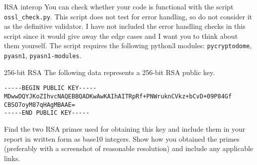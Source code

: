 \documentclass{homework}
\begin{document}
\begin{task}{RSA interop}
  You can check whether your code is functional with the script \texttt{ossl\_check.py}.
  This script does not test for error handling, so do not consider it as the definitive validator.
  I have not included the error handling checks in this script since it would give away the edge cases and I want you to think about them yourself.
  The script requires the following python3 modules: \texttt{pycryptodome}, \texttt{pyasn1}, \texttt{pyasn1-modules}.

  \iffalse
  \begin{tcolorbox}[title=Reading comprehension]
    Beware!
    If you submit a homework which:
    \begin{itemize}
      \item does not pass the test script \textbf{and}
      \item do not mention this in your report \textbf{and}
      \item do not describe in your report what you tried and what problems you still have,
    \end{itemize}
    I will consider your homework as unsubmitted for grading.
    If the deadline hits with your homework in this state, you fail the homework.
    \tcblower
    Motivation: in cryptography (and cybersecurity in general), paying close attention to details is crucial.
    If you cannot be bothered to pay attention and check whether things work, you should not work in cryptography.
  \end{tcolorbox}
  \fi
\end{task}

\begin{task}{256-bit RSA}
  The following data represents a 256-bit RSA public key.
  \begin{Verbatim}
-----BEGIN PUBLIC KEY-----
MDwwDQYJKoZIhvcNAQEBBQADKwAwKAIhAITRpRf+PNWruknCVkz+bCvD+09P84Gf
CBSO7oyM87qHAgMBAAE=
-----END PUBLIC KEY-----
  \end{Verbatim}
  Find the two RSA primes used for obtaining this key and include them in your report in written form as base10 integers.
  Show how you obtained the primes (preferably with a screenshot of reasonable resolution) and include any applicable links.
\end{task}
\end{document}
